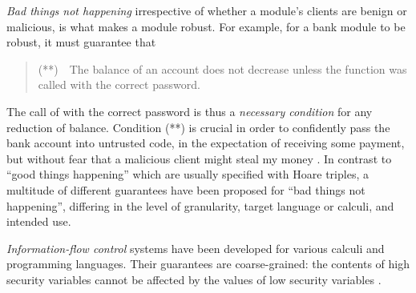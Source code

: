    \vspace{.03in}
\emph{Bad things not happening}
   irrespective of whether a module's clients are benign or malicious, is what makes a module  robust. 
{For example}, for a bank module to 
be robust, it must 
guarantee  that
\begin{quote}
(**)\  \ The balance of an account does not decrease unless the  function was called 
with the  correct password.
\end{quote}
The call of   with the  correct password is thus
a \emph{necessary condition} for any reduction of  balance.
 Condition   
(**) is crucial in order to confidently pass the bank account into untrusted code, 
in the expectation of receiving some payment, but without fear
that a malicious client might steal my money \cite{ELang,miller-esop2013}.
%
In contrast to ``good things   happening''  which are usually specified with %
Hoare triples,  a multitude of different guarantees have been proposed for ``bad things  not
happening'', differing in the level 
of granularity,   target  language or calculi, and intended use.

 
 

\emph{Information-flow control}  systems have been developed for
various calculi and programming languages. Their 
 guarantees are coarse-grained:  the contents of high security variables cannot
be affected by the values of low security variables 
\cite{Zdancewic:Myers:01,noninteferenceOS}. 
 
